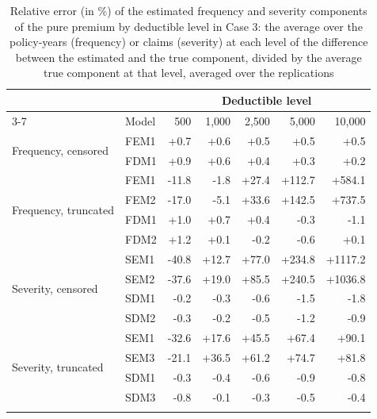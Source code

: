 \begin{table}[!ht]
\footnotesize
\centering
{\color{blue}
\begin{tabular}{llrrrrr}
\toprule
 & & \multicolumn{5}{c}{Deductible level} \\
\cmidrule(lr){3-7}
 & Model &    500 &  1,000 &  2,500 &  5,000 & 10,000 \\
\midrule
\multirow{2}{*}{Frequency, censored} & FEM1 & +0.7 & +0.6 & +0.5 & +0.5 & +0.5 \\
 & FDM1 & +0.9 & +0.6 & +0.4 & +0.3 & +0.2 \\
\midrule
\multirow{4}{*}{Frequency, truncated} & FEM1 & -11.8 & -1.8 & +27.4 & +112.7 & +584.1 \\
 & FEM2 & -17.0 & -5.1 & +33.6 & +142.5 & +737.5 \\
 & FDM1 & +1.0 & +0.7 & +0.4 & -0.3 & -1.1 \\
 & FDM2 & +1.2 & +0.1 & -0.2 & -0.6 & +0.1 \\
\midrule
\multirow{4}{*}{Severity, censored} & SEM1 & -40.8 & +12.7 & +77.0 & +234.8 & +1117.2 \\
 & SEM2 & -37.6 & +19.0 & +85.5 & +240.5 & +1036.8 \\
 & SDM1 & -0.2 & -0.3 & -0.6 & -1.5 & -1.8 \\
 & SDM2 & -0.3 & -0.2 & -0.5 & -1.2 & -0.9 \\
\midrule
\multirow{4}{*}{Severity, truncated} & SEM1 & -32.6 & +17.6 & +45.5 & +67.4 & +90.1 \\
 & SEM3 & -21.1 & +36.5 & +61.2 & +74.7 & +81.8 \\
 & SDM1 & -0.3 & -0.4 & -0.6 & -0.9 & -0.8 \\
 & SDM3 & -0.8 & -0.1 & -0.3 & -0.5 & -0.4 \\
\hhline{=======}
\end{tabular}
}
\caption{Relative error (in \%) of the estimated frequency and severity components of the pure premium by deductible level in Case 3: the average over the policy-years (frequency) or claims (severity) at each level of the difference between the estimated and the true component, divided by the average true component at that level, averaged over the replications}\label{tab:bylevel3}
\end{table}
